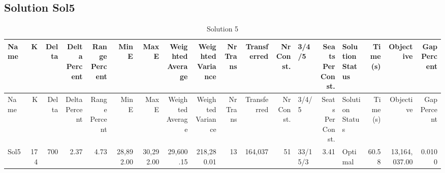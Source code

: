 \documentclass[a4paper]{article}
\begin{document}
\clearpage
\subsection{Solution Sol5}

{\scriptsize
\begin{longtable}{lrrrrrrrrrrrlrlrrr}
\caption{Solution 5}
\\ \toprule
Name &K &Delta &\shortstack{Delta\\Percent} &\shortstack{Range\\Percent} &Min E &Max E &\shortstack{Weighted\\Average} &\shortstack{Weighted\\Variance} &\shortstack{Nr\\Trans} &Transferred &\shortstack{Nr\\Const.} &3/4/5 &\shortstack{Seats\\Per\\Const.} &\shortstack{Solution\\Status} &\shortstack{Time\\(s)} &Objective &\shortstack{Gap\\Percent} \\ \midrule
\endfirsthead
\toprule
Name &K &Delta &\shortstack{Delta\\Percent} &\shortstack{Range\\Percent} &Min E &Max E &\shortstack{Weighted\\Average} &\shortstack{Weighted\\Variance} &\shortstack{Nr\\Trans} &Transferred &\shortstack{Nr\\Const.} &3/4/5 &\shortstack{Seats\\Per\\Const.} &\shortstack{Solution\\Status} &\shortstack{Time\\(s)} &Objective &\shortstack{Gap\\Percent} \\ \midrule
\endhead
\bottomrule
\endfoot
Sol5&174&700& 2.37& 4.73&28,892.00&30,292.00&29,600.15&218,280.01&13&164,037&51&33/15/3& 3.41&Optimal&60.58&13,164,037.00&0.0100\\ 
\end{longtable}

}
\end{document}
